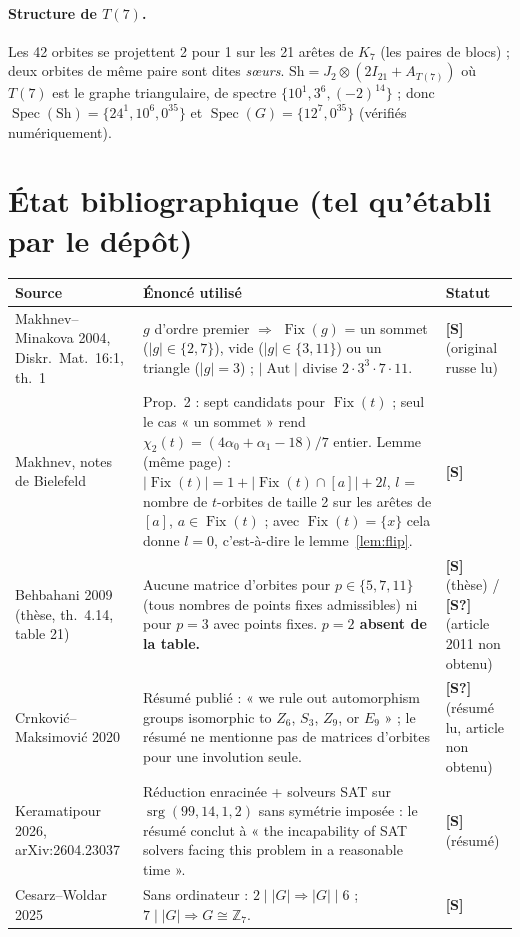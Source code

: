 \documentclass[11pt,a4paper]{article}
\theoremstyle{definition}
\theoremstyle{remark}
\newcommand{\Z}{\mathbb{Z}}
\newcommand{\Fix}{\operatorname{Fix}}
\newcommand{\srg}{\operatorname{srg}}
\newcommand{\Aut}{\operatorname{Aut}}
\newcommand{\Spec}{\operatorname{Spec}}
\newcommand{\Sh}{\mathrm{Sh}}
\newcommand{\st}[1]{\textbf{[#1]}}
\begin{document}
\paragraph{Structure de $T(7)$.} Les 42 orbites se projettent 2 pour 1 sur les 21 arêtes de $K_7$ (les paires de blocs) ; deux orbites de même paire sont dites
\emph{sœurs}. $\Sh=J_2\otimes(2I_{21}+A_{T(7)})$ où $T(7)$ est le graphe triangulaire, de spectre $\{10^1,3^6,(-2)^{14}\}$ ; donc
$\Spec(\Sh)=\{24^1,10^6,0^{35}\}$ et $\Spec(G)=\{12^7,0^{35}\}$ (vérifiés numériquement).

\section{État bibliographique (tel qu'établi par le dépôt)}\label{sec:biblio}
\begin{longtable}{p{4.6cm}p{7.6cm}p{2.6cm}}
\toprule
Source & Énoncé utilisé & Statut\\
\midrule
Makhnev--Minakova 2004, Diskr.\ Mat.\ 16:1, th.~1 & $g$ d'ordre premier $\Rightarrow$ $\Fix(g)$ = un sommet ($|g|\in\{2,7\}$), vide ($|g|\in\{3,11\}$) ou un triangle ($|g|=3$) ; $|\Aut|$ divise $2\cdot3^3\cdot7\cdot11$. & \st{S} (original russe lu)\\
Makhnev, notes de Bielefeld & Prop.~2 : sept candidats pour $\Fix(t)$ ; seul le cas « un sommet » rend $\chi_2(t)=(4\alpha_0+\alpha_1-18)/7$ entier. Lemme (même page) : $|\Fix(t)|=1+|\Fix(t)\cap[a]|+2l$, $l$ = nombre de $t$-orbites de taille 2 sur les arêtes de $[a]$, $a\in\Fix(t)$ ; avec $\Fix(t)=\{x\}$ cela donne $l=0$, c'est-à-dire le lemme~\ref{lem:flip}. & \st{S}\\
Behbahani 2009 (thèse, th.~4.14, table 21) & Aucune matrice d'orbites pour $p\in\{5,7,11\}$ (tous nombres de points fixes admissibles) ni pour $p=3$ avec points fixes. \textbf{$p=2$ absent de la table.} & \st{S} (thèse) / \st{S?} (article 2011 non obtenu)\\
Crnković--Maksimović 2020 & Résumé publié : « we rule out automorphism groups isomorphic to $Z_6$, $S_3$, $Z_9$, or $E_9$ » ; le résumé ne mentionne pas de matrices d'orbites pour une involution seule. & \st{S?} (résumé lu, article non obtenu)\\
Keramatipour 2026, arXiv:2604.23037 & Réduction enracinée + solveurs SAT sur $\srg(99,14,1,2)$ sans symétrie imposée : le résumé conclut à « the incapability of SAT solvers facing this problem in a reasonable time ». & \st{S} (résumé)\\
Cesarz--Woldar 2025 & Sans ordinateur : $2\mid|G|\Rightarrow|G|\mid6$ ; $7\mid|G|\Rightarrow G\cong\Z_7$. & \st{S}\\

\end{longtable}
\end{document}
